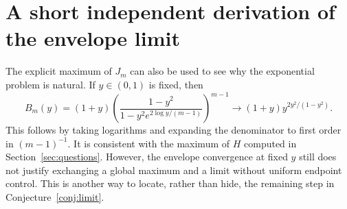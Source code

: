 \section{A short independent derivation of the envelope limit}
The explicit maximum of $J_m$ can also be used to see why the exponential problem is natural. If $y\in(0,1)$ is fixed, then
\[
 B_m(y)=(1+y)\left(
 \frac{1-y^2}{1-y^2e^{2\log y/(m-1)}}\right)^{m-1}
 \longrightarrow(1+y)y^{2y^2/(1-y^2)}.
\]
This follows by taking logarithms and expanding the denominator to first order in $(m-1)^{-1}$. It is consistent with the maximum of $H$ computed in Section~\ref{sec:questions}. However, the envelope convergence at fixed $y$ still does not justify exchanging a global maximum and a limit without uniform endpoint control. This is another way to locate, rather than hide, the remaining step in Conjecture~\ref{conj:limit}.
